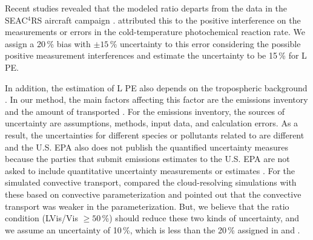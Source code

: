 \documentclass[amt]{copernicus}
\begin{document}
Recent studies revealed that the modeled  ratio departs from the data in the SEAC$^{4}$RS aircraft campaign \citep{Travis.2016,Silvern.2018}.
\citet{Silvern.2018} attributed this to the positive interference on the  measurements or errors in the cold-temperature  photochemical reaction rate.
We assign a 20\,{\%} bias with $\pm 15$\,{\%} uncertainty to this error considering the possible positive  measurement interferences \citep{Allen.2019,Bucsela.2019} and estimate the uncertainty to be 15\,{\%} for L PE.

In addition, the estimation of L PE also depends on the tropospheric background .
In our method, the main factors affecting this factor are the emissions inventory and the amount of transported .
For the emissions inventory, the sources of uncertainty are assumptions, methods, input data, and calculation errors.
As a result, the uncertainties for different species or pollutants related to  are different and the U.S. EPA also does not publish the quantified uncertainty measures because the parties that submit emissions estimates to the U.S. EPA are not asked to include quantitative uncertainty measurements or estimates \citep{us20152011}.
For the simulated convective transport, \citet{Li.2018} compared the cloud-resolving simulations with these based on convective parameterization and pointed out that the convective transport was weaker in the parameterization.
But, we believe that the ratio condition (LVis/Vis $\geq 50$\,{\%}) should reduce these two kinds of uncertainty, and we assume an uncertainty of 10\,{\%}, which is less than the 20\,{\%} assigned in \citet{Allen.2019} and \citet{Bucsela.2019}.
\end{document}
